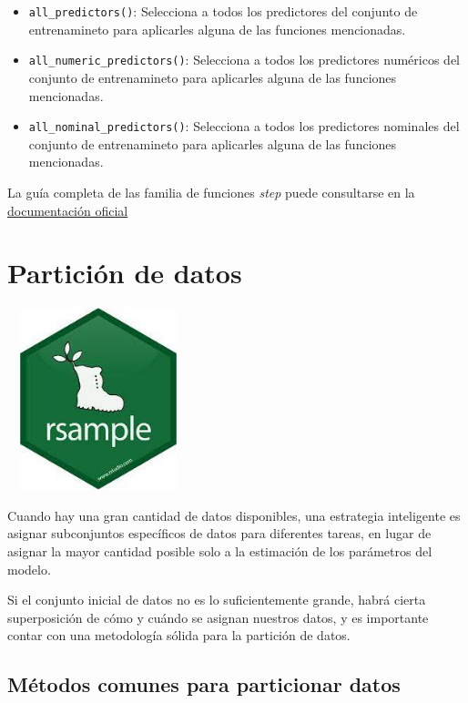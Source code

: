 \documentclass[
]{book}
\begin{document}
\begin{itemize}
\item
  \texttt{all\_predictors()}: Selecciona a todos los predictores del conjunto de entrenamineto para aplicarles alguna de las funciones mencionadas.
\item
  \texttt{all\_numeric\_predictors()}: Selecciona a todos los predictores numéricos del conjunto de entrenamineto para aplicarles alguna de las funciones mencionadas.
\item
  \texttt{all\_nominal\_predictors()}: Selecciona a todos los predictores nominales del conjunto de entrenamineto para aplicarles alguna de las funciones mencionadas.
\end{itemize}

La guía completa de las familia de funciones \emph{step} puede consultarse en la \href{https://recipes.tidymodels.org/reference/index.html}{documentación oficial}

\hypertarget{particiuxf3n-de-datos}{%
\section{Partición de datos}\label{particiuxf3n-de-datos}}

\begin{flushleft}\includegraphics[width=150pt,height=150pt]{img/04-ml/3-5-particion-datos} \end{flushleft}

Cuando hay una gran cantidad de datos disponibles, una estrategia inteligente es asignar subconjuntos específicos de datos para diferentes tareas, en lugar de asignar la mayor cantidad posible solo a la estimación de los parámetros del modelo.

Si el conjunto inicial de datos no es lo suficientemente grande, habrá cierta superposición
de cómo y cuándo se asignan nuestros datos, y es importante contar con una metodología
sólida para la partición de datos.

\hypertarget{muxe9todos-comunes-para-particionar-datos}{%
\subsection{Métodos comunes para particionar datos}\label{muxe9todos-comunes-para-particionar-datos}}
\end{document}
